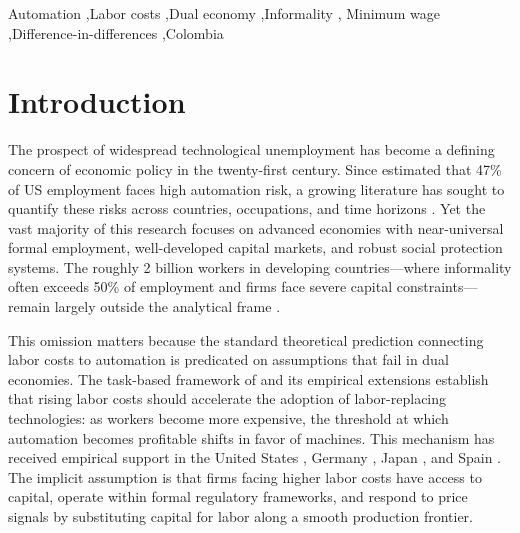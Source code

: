 \documentclass[5p,times,authoryear]{elsarticle}
\begin{document}
\begin{frontmatter}

\begin{keyword}
  Automation \sep Labor costs \sep Dual economy \sep Informality \sep
  Minimum wage \sep Difference-in-differences \sep Colombia
\end{keyword}

\end{frontmatter}


\section{Introduction}
\label{sec:introduction}

The prospect of widespread technological unemployment has become a defining concern of economic policy in the twenty-first century. Since \citet{frey2017future} estimated that 47\% of US employment faces high automation risk, a growing literature has sought to quantify these risks across countries, occupations, and time horizons \citep{arntz2016, webb2020, eloundou2023gpts}. Yet the vast majority of this research focuses on advanced economies with near-universal formal employment, well-developed capital markets, and robust social protection systems. The roughly 2 billion workers in developing countries---where informality often exceeds 50\% of employment and firms face severe capital constraints---remain largely outside the analytical frame \citep{laporta2014, arias2023informality}.

This omission matters because the standard theoretical prediction connecting labor costs to automation is predicated on assumptions that fail in dual economies. The task-based framework of \citet{acemoglu2019automation} and its empirical extensions \citep{acemoglu2020robots, acemoglu2022tasks} establish that rising labor costs should accelerate the adoption of labor-replacing technologies: as workers become more expensive, the threshold at which automation becomes profitable shifts in favor of machines. This mechanism has received empirical support in the United States \citep{acemoglu2020robots}, Germany \citep{dauth2021}, Japan \citep{adachi2022}, and Spain \citep{koch2021}. The implicit assumption is that firms facing higher labor costs have access to capital, operate within formal regulatory frameworks, and respond to price signals by substituting capital for labor along a smooth production frontier.
\end{document}

